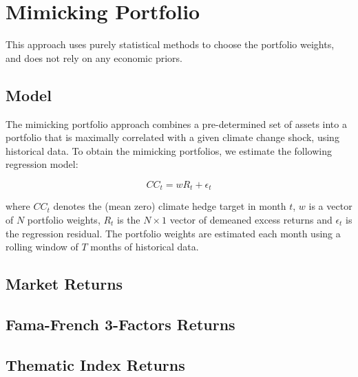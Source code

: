 \chapter{Mimicking Portfolio}

This approach uses purely statistical methods to choose the 
portfolio weights, and does not rely on any economic priors.

\section{Model}

The mimicking portfolio approach combines a pre-determined set of 
assets into a portfolio that is maximally correlated with a given 
climate change shock, using historical data. To obtain the mimicking
portfolios, we estimate the following regression model:

\begin{equation}
    \label{eq:regression}
    CC_t = w R_t + \epsilon_t
\end{equation}

where $CC_t$ denotes the (mean zero) climate hedge target in month $t$,
$w$ is a vector of $N$ portfolio weights, $R_t$ is the $N \times 1$ vector 
of demeaned excess returns and $\epsilon_t$ is the regression residual.
The portfolio weights are estimated each month using a rolling window of
$T$ months of historical data. 


\section{Market Returns}

\section{Fama-French 3-Factors Returns}

\section{Thematic Index Returns}
